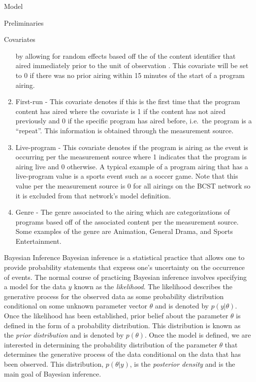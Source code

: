 \begin{chapter}{Model}
\begin{section}{Preliminaries}
\begin{subsection}{Covariates}
\begin{enumerate}
      by allowing for random effects based off the of the content identifier that aired immediately prior to the unit of observation \cite{tvforecasting}.
      This covariate will be set to 0 if there was no prior airing within 15 minutes of the start of a program airing.
    \item First-run - This covariate denotes if this is the first time that the program content has aired where the covariate
      is 1 if the content has not aired previously and 0 if the specific program has aired before, i.e.\ the program is a ``repeat''.
      This information is obtained through the measurement source.
    \item Live-program - This covariate denotes if the program is airing as the event is occurring per the measurement source
      where 1 indicates that the program is airing live and 0 otherwise.
      A typical example of a program airing that has a live-program value is a sports event such as a soccer game.
      Note that this value per the measurement source is 0 for all airings on the BCST network so it is excluded from
      that network's model definition.
    \item Genre - The genre associated to the airing which are categorizations
      of programs based off of the associated content per the measurement source.
      Some examples of the genre are Animation, General Drama, and Sports Entertainment.
    \end{enumerate}
  \end{subsection}

  \begin{subsection}{Bayesian Inference}
    Bayesian inference is a statistical practice that allows one to provide probability
    statements that express one's uncertainty on the occurrence of events.
    The normal course of practicing Bayesian inference involves specifying a model for the data $y$ known
    as the \emph{likelihood}. The likelihood describes the generative process for the observed data
    as some probability distribution conditional on some unknown parameter vector $\theta$ and is denoted
    by $p(y | \theta)$. Once the likelihood has been established, prior belief about the parameter $\theta$
    is defined in the form of a probability distribution. This distribution is known as the
    \emph{prior distribution} and is denoted by $p(\theta)$. Once the model is defined,
    we are interested in determining the probability distribution of the parameter $\theta$
    that determines the generative process of the data
    conditional on the data that has been observed. This distribution, $p(\theta | y)$,
    is the \emph{posterior density} and is the main goal of Bayesian inference.


\end{subsection}
\end{section}
\end{chapter}
